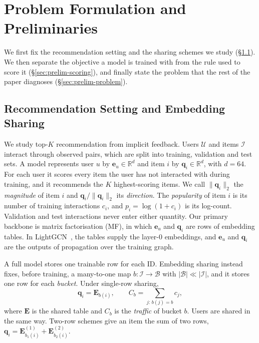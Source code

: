\section{Problem Formulation and Preliminaries}\label{sec:prelim}

We first fix the recommendation setting and the sharing schemes we study (\S\ref{sec:prelim-setting}). We then separate the objective a model is trained with from the rule used to score it (\S\ref{sec:prelim-scoring}), and finally state the problem that the rest of the paper diagnoses (\S\ref{sec:prelim-problem}).

\subsection{Recommendation Setting and Embedding Sharing}\label{sec:prelim-setting}

We study top-$K$ recommendation from implicit feedback. Users $\mathcal{U}$ and items $\mathcal{I}$ interact through observed pairs, which are split into training, validation and test sets. A model represents user $u$ by $\mathbf{e}_u\in\mathbb{R}^d$ and item $i$ by $\mathbf{q}_i\in\mathbb{R}^d$, with $d=64$. For each user it scores every item the user has not interacted with during training, and it recommends the $K$ highest-scoring items. We call $\|\mathbf{q}_i\|_2$ the \emph{magnitude} of item $i$ and $\mathbf{q}_i/\|\mathbf{q}_i\|_2$ its \emph{direction}. The \emph{popularity} of item $i$ is its number of training interactions $c_i$, and $p_i=\log(1+c_i)$ is its log-count. Validation and test interactions never enter either quantity. Our primary backbone is matrix factorisation (MF), in which $\mathbf{e}_u$ and $\mathbf{q}_i$ are rows of embedding tables. In LightGCN~\cite{he2020lightgcn}, the tables supply the layer-0 embeddings, and $\mathbf{e}_u$ and $\mathbf{q}_i$ are the outputs of propagation over the training graph.

A full model stores one trainable row for each ID. Embedding sharing instead fixes, before training, a many-to-one map $b:\mathcal{I}\to\mathcal{B}$ with $|\mathcal{B}|\ll|\mathcal{I}|$, and it stores one row for each \emph{bucket}. Under single-row sharing,
\begin{equation}\label{eq:sharing}
  \mathbf{q}_i=\mathbf{E}_{b(i)},\qquad C_b=\sum_{j:\,b(j)=b}c_j,
\end{equation}
where $\mathbf{E}$ is the shared table and $C_b$ is the \emph{traffic} of bucket $b$. Users are shared in the same way. Two-row schemes give an item the sum of two rows, $\mathbf{q}_i=\mathbf{E}^{(1)}_{b_1(i)}+\mathbf{E}^{(2)}_{b_2(i)}$.

